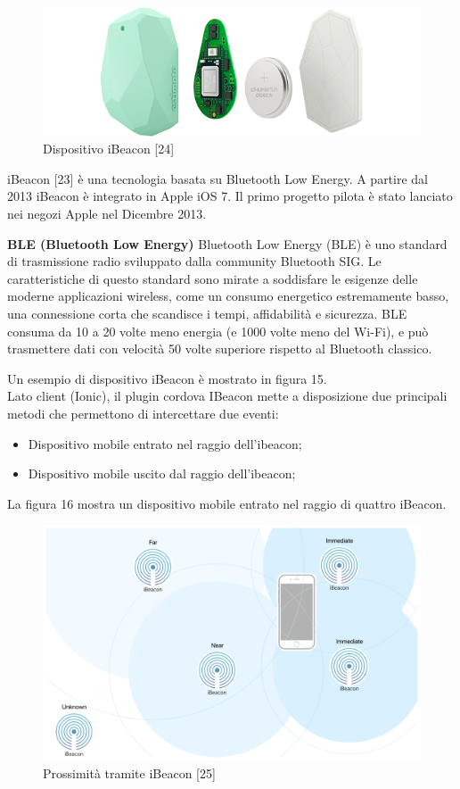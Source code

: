 \begin{figure}[H]
    \centering  
    \caption{Dispositivo iBeacon [24]}
    \includegraphics[scale=0.3]{img/cap2/beacon}
\end{figure}

iBeacon [23] è una tecnologia basata su Bluetooth Low Energy. A partire dal 2013 iBeacon è 
integrato in Apple iOS 7. Il primo progetto pilota è stato lanciato nei negozi Apple nel
Dicembre 2013.

\textbf{BLE (Bluetooth Low Energy)}
Bluetooth Low Energy (BLE) è uno standard di trasmissione radio sviluppato dalla community 
Bluetooth SIG. Le caratteristiche di questo standard sono mirate a soddisfare le esigenze
delle moderne applicazioni wireless, come un consumo energetico estremamente basso, una
connessione corta che scandisce i tempi, affidabilità e sicurezza. 
BLE consuma da 10 a 20 volte meno energia (e 1000 volte meno del Wi-Fi), e può trasmettere
dati con velocità 50 volte superiore rispetto al Bluetooth classico. 

Un esempio di dispositivo iBeacon è mostrato in figura 15.\\
Lato client (Ionic), il plugin cordova IBeacon mette a disposizione due principali metodi
che permettono di intercettare due eventi:

\begin{itemize}
    \item Dispositivo mobile entrato nel raggio dell'ibeacon;
    \item Dispositivo mobile uscito dal raggio dell'ibeacon;
\end{itemize}

La figura 16 mostra un dispositivo mobile entrato nel raggio di quattro iBeacon.
\begin{figure}[H]
    \centering  
    \caption{Prossimità tramite iBeacon [25]}
    \includegraphics[scale=0.3]{img/cap2/beacon-proximity}
\end{figure}


